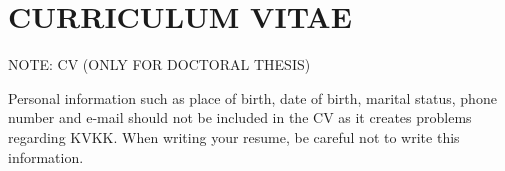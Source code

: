 \chapter*{CURRICULUM VITAE}


NOTE: CV (ONLY FOR DOCTORAL THESIS)

Personal information such as place of birth, date of birth, marital status, phone number and e-mail should not be included in the CV as it creates problems regarding KVKK. When writing your resume, be careful not to write this information.


